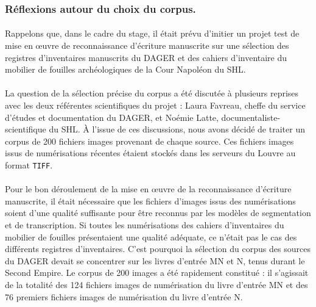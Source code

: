 \documentclass[a4paper,12pt,twoside]{book}
\begin{document}
		\subsubsection{Réflexions autour du choix du corpus.}
		
\paragraph{}
Rappelons que, dans le cadre du stage, il était prévu d’initier un projet test de mise en œuvre de reconnaissance d’écriture manuscrite sur une sélection des registres d’inventaires manuscrits du DAGER et des cahiers d’inventaire du mobilier de fouilles archéologiques de la Cour Napoléon du SHL.

\paragraph{}
La question de la sélection précise du corpus a été discutée à plusieurs reprises avec les deux référentes scientifiques du projet : Laura Favreau, cheffe du service d’études et documentation du DAGER, et Noémie Latte, documentaliste-scientifique du SHL. À l'issue de ces discussions, nous avons décidé de traiter un corpus de 200 fichiers images provenant de chaque source. Ces fichiers images issus de numérisations récentes étaient stockés dans les serveurs du Louvre au format \texttt{TIFF}. 

\paragraph{}
Pour le bon déroulement de la mise en œuvre de la reconnaissance d’écriture manuscrite, il était nécessaire que les fichiers d'images issus des numérisations soient d’une qualité suffisante pour être reconnus par les modèles de segmentation et de transcription. Si toutes les numérisations des cahiers d’inventaires du mobilier de fouilles présentaient une qualité adéquate, ce n’était pas le cas des différents registres d’inventaires. C’est pourquoi la sélection du corpus des sources du DAGER devait se concentrer sur les livres d’entrée MN et N, tenus durant le Second Empire. Le corpus de 200 images a été rapidement constitué : il s’agissait de la totalité des 124 fichiers images de numérisation du livre d’entrée MN et des 76 premiers fichiers images de numérisation du livre d’entrée N.
\end{document}
